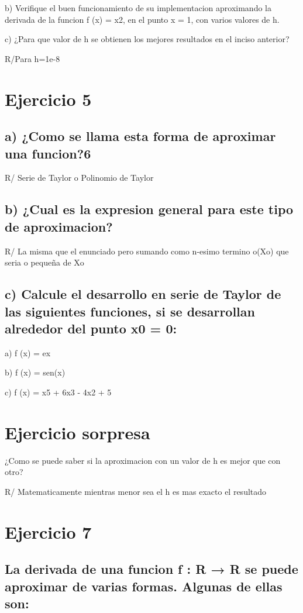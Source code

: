 \documentclass[a4paper,12pt]{article}
\begin{document}
b) Verifique el buen funcionamiento de su implementacion aproximando la derivada de la funcion
f (x) = x2, en el punto x = 1, con varios valores de h.

c) ¿Para que valor de h se obtienen los mejores resultados en el inciso anterior?

R/Para h=1e-8

\section*{Ejercicio 5}
\subsection*{a) ¿Como se llama esta forma de aproximar una funcion?6}

R/ Serie de Taylor o Polinomio de Taylor

\subsection*{b) ¿Cual es la expresion general para este tipo de aproximacion?}

R/ La misma que el enunciado pero sumando como n-esimo termino o(Xo) que seria o pequeña de Xo

\subsection*{c) Calcule el desarrollo en serie de Taylor de las siguientes funciones, si se desarrollan
alrededor del punto x0 = 0:}

a) f (x) = ex 

b) f (x) = sen(x)

c) f (x) = x5 + 6x3 - 4x2 + 5

\section*{Ejercicio sorpresa}
¿Como se puede saber si la aproximacion con un valor de h es mejor que con otro?

R/ Matematicamente mientras menor sea el h es mas exacto el resultado

\section*{Ejercicio 7}
\subsection*{La derivada de una funcion f : R → R se puede aproximar de varias formas. Algunas de ellas son:}
\end{document}

